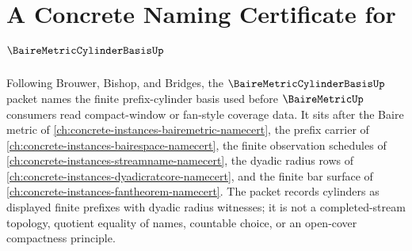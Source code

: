 \chapter{A Concrete Naming Certificate for $\BaireMetricCylinderBasisUp$}
\label{ch:concrete-instances-baire-metric-cylinder-basis-namecert}

Following Brouwer, Bishop, and Bridges, the $\BaireMetricCylinderBasisUp$ packet names the finite prefix-cylinder basis used before $\BaireMetricUp$ consumers read compact-window or fan-style coverage data. It sits after the Baire metric of \autoref{ch:concrete-instances-bairemetric-namecert}, the prefix carrier of \autoref{ch:concrete-instances-bairespace-namecert}, the finite observation schedules of \autoref{ch:concrete-instances-streamname-namecert}, the dyadic radius rows of \autoref{ch:concrete-instances-dyadicratcore-namecert}, and the finite bar surface of \autoref{ch:concrete-instances-fantheorem-namecert}. The packet records cylinders as displayed finite prefixes with dyadic radius witnesses; it is not a completed-stream topology, quotient equality of names, countable choice, or an open-cover compactness principle.

